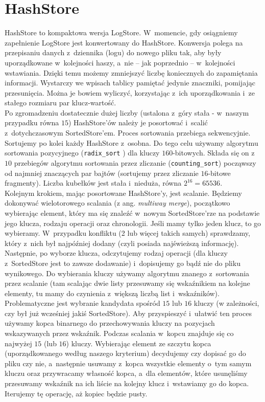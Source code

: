 \documentclass[declaration,shortabstract,masc]{iithesis}
\begin{document}
		\section{HashStore}
			HashStore to kompaktowa wersja LogStore. W~momencie, gdy osiągniemy zapełnienie LogStore jest konwertowany do HashStore. Konwersja polega na przepisaniu danych z~dziennika (logu) do nowego pliku tak, aby były uporządkowane w~kolejności haszy, a~nie -- jak poprzednio -- w~kolejności wstawiania. Dzięki temu możemy zmniejszyć liczbę koniecznych do zapamiętania informacji. Wystarczy we wpisach tablicy pamiętać jedynie znaczniki, pomijając przesunięcia. Można je bowiem wyliczyć, korzystając z~ich uporządkowania i~ze stałego rozmiaru par klucz-wartość.\\
			\indent Po zgromadzeniu dostatecznie dużej liczby (ustalona z~góry stała - w~naszym przypadku równa $15$) HashStore'ów należy je posortować i~scalić z~dotychczasowym SortedStore'em. Proces sortowania przebiega sekwencyjnie. Sortujemy po kolei każdy HashStore z~osobna. Do tego celu używamy algorytmu sortowania pozycyjnego (\texttt{radix\_sort} \cite{Cormen}) dla kluczy $160$-bitowych. Składa się on z~$10$ przebiegów algorytmu sortowania przez zliczanie (\texttt{counting\_sort}) począwszy od najmniej znaczących par bajtów (sortujemy przez zliczanie $16$-bitowe fragmenty). Liczba kubełków jest stała i~nieduża, równa $2^{16} = 65536$.\\
			\indent Kolejnym krokiem, mając posortowane HashStore'y, jest scalanie. Będziemy dokonywać wielotorowego scalania (z ang. \textit{multiway merge}), początkowo wybierając element, który ma się znaleźć w~nowym SortedStore'rze na podstawie jego klucza, rodzaju operacji oraz chronologii. Jeśli mamy tylko jeden klucz, to go wybieramy. W~przypadku konfliktu (2 lub więcej takich samych) sprawdzamy, który z~nich był najpóźniej dodany (czyli posiada najświeższą informację). Następnie, po wyborze klucza, odczytujemy rodzaj operacji (dla kluczy z~SortedStore jest to zawsze dodawanie) i~dopisujemy go bądź nie do pliku wynikowego. Do wybierania kluczy używamy algorytmu znanego z~sortowania przez scalanie (tam scalając dwie listy przesuwamy się wskaźnikiem na kolejne elementy, tu mamy do czynienia z~większą liczbą list i~wskaźników). Problematyczne jest wybranie kandydata spośród $15$ lub $16$ kluczy (w zależności, czy był już wcześniej jakiś SortedStore). Aby przyspieszyć i~ułatwić ten proces używamy kopca binarnego do przechowywania kluczy na pozycjach wskazywanych przez wskaźnik. Podczas scalania w~kopcu znajduje się co najwyżej $15$ (lub $16$) kluczy. Wybierając element ze szczytu kopca (uporządkowanego według naszego kryterium) decydujemy czy dopisać go do pliku czy nie, a~następnie usuwamy z~kopca wszystkie elementy o~tym samym kluczu oraz przywracamy własność kopca, a~dla elementów, które usunęliśmy przesuwamy wskaźnik na ich liście na kolejny klucz i~wstawiamy go do kopca. Iterujemy tę operację, aż kopiec będzie pusty.
\end{document}
